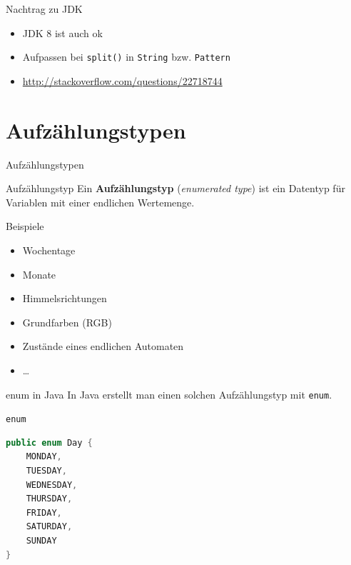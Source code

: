 \documentclass[18pt]{beamer}
\begin{document}
\begin{frame}{Nachtrag zu JDK}
    \begin{itemize}
        \item JDK 8 ist auch ok
        \item \alert{Aufpassen bei \texttt{split()} in \texttt{String} bzw. \texttt{Pattern}}
        \item \url{http://stackoverflow.com/questions/22718744}
    \end{itemize}
\end{frame}

\section{Aufzählungstypen}

\begin{frame}{Aufzählungstypen}
    \begin{block}{Aufzählungstyp}
        Ein \textbf{Aufzählungstyp} (\textit{enumerated type}) ist ein Datentyp für Variablen mit einer endlichen Wertemenge.
    \end{block}

    \begin{exampleblock}{Beispiele}
        \begin{itemize}
            \item Wochentage
            \item Monate
            \item Himmelsrichtungen
            \item Grundfarben (RGB)
            \item Zustände eines endlichen Automaten
            \item \dots
        \end{itemize}
    \end{exampleblock}
\end{frame}

\begin{frame}[fragile]{enum in Java}
    In Java erstellt man einen solchen Aufzählungstyp mit \texttt{enum}.
    \begin{exampleblock}{\texttt{enum}}
        \begin{lstlisting}[language=Java]
public enum Day {
    MONDAY,
    TUESDAY,
    WEDNESDAY,
    THURSDAY,
    FRIDAY,
    SATURDAY,
    SUNDAY
}
        \end{lstlisting}
    \end{exampleblock}
\end{frame}
\end{document}
